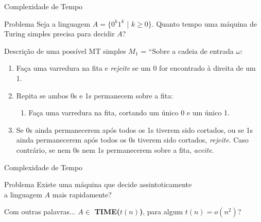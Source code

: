 \documentclass[xcolor=dvipsnames,table]{beamer}
\begin{document}
	\begin{frame}[shrink]{Complexidade de Tempo}
		\begin{block}{Problema}
			Seja a linguagem $A = \{ 0^k 1^k$ | $k \geq 0 \}$. Quanto tempo uma máquina de Turing simples precisa para decidir $A$?
		\end{block} 
		\begin{block}{Descrição de uma possível MT simples}
			$M_1$ = ``Sobre a cadeia de entrada $\omega$:
			\begin{enumerate}
				\item Faça uma varredura na fita e {\it rejeite} se um 0 for encontrado à direita de um 1.
				\item Repita se ambos 0s e 1s permanecem sobre a fita:
				\begin{enumerate}
					\item Faça uma varredura na fita, cortando um único 0 e um único 1.
				\end{enumerate}
				\item Se 0s ainda permanecerem após todos os 1s tiverem sido cortados, ou se 1s ainda permanecerem após todos os 0s tiverem sido cortados, {\it rejeite}. Caso contrário, se nem 0s nem 1s permanecerem sobre a fita, {\it aceite}.
			\end{enumerate}
		\end{block}
	\end{frame}
	
	\begin{frame}{Complexidade de Tempo}
		\begin{block}{Problema}
			Existe uma máquina que decide assintoticamente \\a linguagem $A$ mais rapidamente?
		\end{block} \pause
		\begin{block}{Com outras palavras...}
			$A \in$ {\bf TIME($t(n)$)}, para algum $t(n) = o(n^2)$?
		\end{block}
	\end{frame}
	
\end{document}
